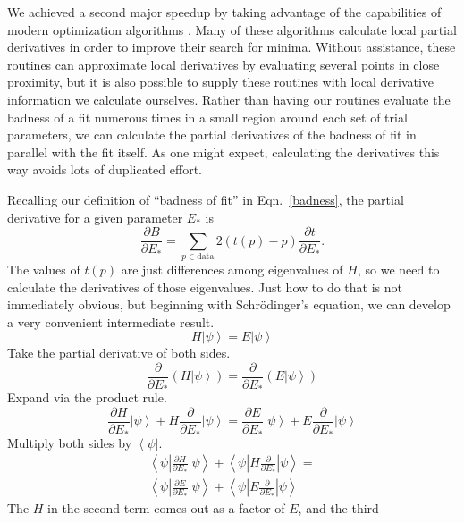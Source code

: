\documentclass[twocolumn]{revtex4}
\newcommand{\bra}[1]{\left< #1 \right|}
\newcommand{\ket}[1]{\left| #1 \right>}
\newcommand{\innerp}[3]{\textstyle\left< #1 \left| #2 \right| #3 \right>}
\begin{document}
We achieved a second major speedup by taking advantage of the
capabilities of modern optimization algorithms \cite{Byrd,Zhu}.
Many of these algorithms calculate local partial derivatives in order
to improve their search for minima. Without assistance, these routines
can approximate local derivatives by evaluating several points in
close proximity, but it is also possible to supply these routines with
local derivative information we calculate ourselves. Rather than
having our routines evaluate the badness of a fit numerous times in a
small region around each set of trial parameters, we can calculate the
partial derivatives of the badness of fit in parallel with the fit
itself. As one might expect, calculating the derivatives this way
avoids lots of duplicated effort.

Recalling our definition of ``badness of fit'' in Eqn.~\eqref{badness},
the partial derivative for a given parameter $E_*$ is
\begin{equation}
  \label{partials}
  \frac{\partial B}{\partial E_{*}} =
  \sum_{p \in \text{data}}2(t(p)-p)\frac{\partial t}{\partial E_*}.
\end{equation}
The values of $t(p)$ are just differences among eigenvalues of $H$, so we
need to calculate the derivatives of those eigenvalues. Just how to do
that is not immediately obvious, but beginning with Schr\"odinger's
equation, we can develop a very convenient intermediate result.
\begin{equation}
  H\ket{\psi} = E\ket{\psi}
\end{equation}
Take the partial derivative of both sides.
\begin{equation}
  \frac{\partial}{\partial E_*} (H\ket{\psi}) =
  \frac{\partial}{\partial E_*} (E\ket{\psi})
\end{equation}
Expand via the product rule.
\begin{equation}
  \frac{\partial H}{\partial E_*}\ket{\psi} +
  H\frac{\partial}{\partial E_*}\ket{\psi} =
  \frac{\partial E}{\partial E_*}\ket{\psi} +
  E\frac{\partial}{\partial E_*}\ket{\psi}
\end{equation}
Multiply both sides by $\bra{\psi}$.
\begin{multline}
  \innerp{\psi}{\frac{\partial H}{\partial E_*}}{\psi} +
  \innerp{\psi}{H\frac{\partial}{\partial E_*}}{\psi} =\\
  \innerp{\psi}{\frac{\partial E}{\partial E_*}}{\psi}+
  \innerp{\psi}{E\frac{\partial}{\partial E_*}}{\psi}
\end{multline}
The $H$ in the second term comes out as a factor of $E$, and the third
\end{document}
